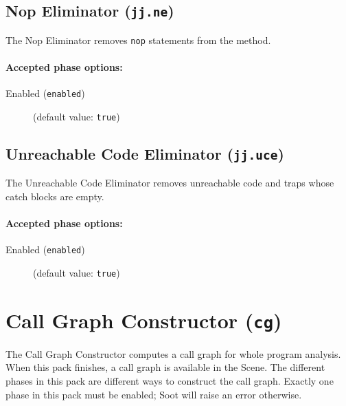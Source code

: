 \documentclass{article}
\begin{document}
\subsection{Nop Eliminator ({\tt jj.ne})}

The Nop Eliminator removes {\tt nop} statements from the method.


\paragraph{Accepted phase options:} 

\begin{description}

\item[Enabled ({\tt enabled})]
(default value: {\tt true})






\end{description}

\subsection{Unreachable Code Eliminator ({\tt jj.uce})}

The Unreachable Code Eliminator removes unreachable code and
traps whose catch blocks are empty.


\paragraph{Accepted phase options:} 

\begin{description}

\item[Enabled ({\tt enabled})]
(default value: {\tt true})






\end{description}

\section{Call Graph Constructor ({\tt cg})}

The Call Graph Constructor computes a call graph for whole
program analysis. When this pack finishes, a call graph is
available in the Scene.  The different phases in this pack are
different ways to construct the call graph. Exactly one phase in
this pack must be enabled; Soot will raise an error otherwise.
\end{document}
